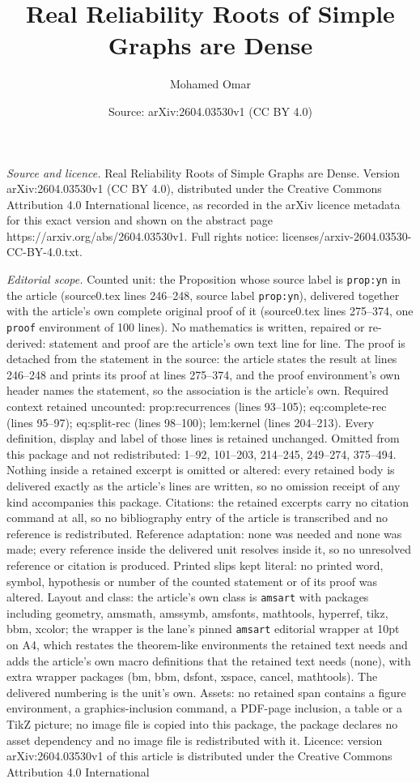 \documentclass[10pt,a4paper]{amsart}
\title[Real Reliability Roots of Simple Graphs are Dense]{Real Reliability Roots of Simple Graphs are Dense}
\author{Mohamed Omar}
\date{Source: arXiv:2604.03530v1 (CC BY 4.0)}
\begin{document}
\maketitle

\noindent\emph{Source and licence.} Real Reliability Roots of Simple Graphs are Dense. Version arXiv:2604.03530v1 (CC BY 4.0), distributed under the Creative Commons Attribution 4.0 International licence, as recorded in the arXiv licence metadata for this exact version and shown on the abstract page https://arxiv.org/abs/2604.03530v1. Full rights notice: licenses/arxiv-2604.03530-CC-BY-4.0.txt.\par\smallskip

\noindent\textit{Editorial scope.} Counted unit: the Proposition whose source label is \texttt{prop:yn} in the article (source0.tex lines 246--248, source label \texttt{prop:yn}), delivered together with the article's own complete original proof of it (source0.tex lines 275--374, one \texttt{proof} environment of 100 lines). No mathematics is written, repaired or re-derived: statement and proof are the article's own text line for line. The proof is detached from the statement in the source: the article states the result at lines 246--248 and prints its proof at lines 275--374, and the proof environment's own header names the statement, so the association is the article's own. Required context retained uncounted: prop:recurrences (lines 93--105); eq:complete-rec (lines 95--97); eq:split-rec (lines 98--100); lem:kernel (lines 204--213). Every definition, display and label of those lines is retained unchanged. Omitted from this package and not redistributed: 1--92, 101--203, 214--245, 249--274, 375--494. Nothing inside a retained excerpt is omitted or altered: every retained body is delivered exactly as the article's lines are written, so no omission receipt of any kind accompanies this package. Citations: the retained excerpts carry no citation command at all, so no bibliography entry of the article is transcribed and no reference is redistributed. Reference adaptation: none was needed and none was made; every reference inside the delivered unit resolves inside it, so no unresolved reference or citation is produced. Printed slips kept literal: no printed word, symbol, hypothesis or number of the counted statement or of its proof was altered. Layout and class: the article's own class is \texttt{amsart} with packages including geometry, amsmath, amssymb, amsfonts, mathtools, hyperref, tikz, bbm, xcolor; the wrapper is the lane's pinned \texttt{amsart} editorial wrapper at 10pt on A4, which restates the theorem-like environments the retained text needs and adds the article's own macro definitions that the retained text needs (none), with extra wrapper packages (bm, bbm, dsfont, xspace, cancel, mathtools). The delivered numbering is the unit's own. Assets: no retained span contains a figure environment, a graphics-inclusion command, a PDF-page inclusion, a table or a TikZ picture; no image file is copied into this package, the package declares no asset dependency and no image file is redistributed with it. Licence: version arXiv:2604.03530v1 of this article is distributed under the Creative Commons Attribution 4.0 International 
\end{document}
